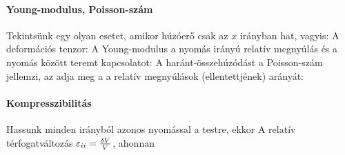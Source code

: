    \paragraph{Young-modulus, Poisson-szám}
    Tekintsünk egy olyan esetet, amikor húzóerő csak az $x$ irányban hat, vagyis:
    A deformációs tenzor:
    A Young-modulus a nyomás irányú relatív megnyúlás és a nyomás között teremt kapcsolatot:
    A haránt-összehúzódást a Poisson-szám jellemzi, az adja meg a a relatív megnyúlások (ellentettjének) arányát:
   \paragraph{Kompresszibilitás}
    
    Hassunk minden irányból azonos nyomással a testre, ekkor
    A relatív térfogatváltozás $\varepsilon_{ii}=\frac{\delta V}{V}$, ahonnan
   
